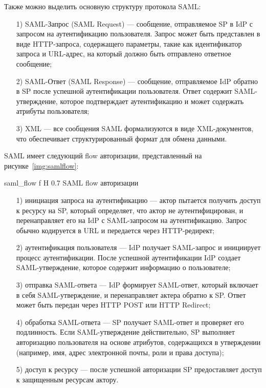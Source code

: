 Также можно выделить основную структуру протокола SAML:
 \begin{enumerate}
  \item[1)] SAML-Запрос (SAML Request) --- сообщение, отправляемое SP в IdP с запросом на аутентификацию пользователя. Запрос может быть представлен в виде HTTP-запроса, содержащего параметры, такие как идентификатор запроса и URL-адрес, на который должно быть отправлено ответное сообщение;
  \item[2)] SAML-Ответ (SAML Response) --- сообщение, отправляемое IdP обратно в SP после успешной аутентификации пользователя. Ответ содержит SAML-утверждение, которое подтверждает аутентификацию и может содержать атрибуты пользователя;
  \item[3)] XML --- все сообщения SAML формализуются в виде XML-документов, что обеспечивает  структурированный формат для обмена данными.
\end{enumerate}

SAML имеет следующий flow авторизации, представленный на рисунке~\ref{img:samlflow}:

    {saml_flow}
    {f}
    {H}
    {0.7\textwidth}
    {SAML flow авторизации}


 \begin{enumerate}
  \item[1)] инициация запроса на аутентификацию --- актор пытается получить доступ к ресурсу на SP, который определяет, что актор не аутентифицирован, и перенаправляет его на IdP с SAML-запросом на аутентификацию. Запрос обычно кодируется в URL и передается через HTTP-редирект;
  \item[2)] аутентификация пользователя --- IdP получает SAML-запрос и инициирует процесс аутентификации. После успешной аутентификации IdP создает SAML-утверждение, которое содержит информацию о пользователе;
  \item[3)] отправка SAML-ответа --- IdP формирует SAML-ответ, который включает в себя SAML-утверждение, и перенаправляет актера обратно к SP. Ответ может быть передан через HTTP POST или HTTP Redirect;
  \item[4)] обработка SAML-ответа --- SP получает SAML-ответ и проверяет его подлинность. Если SAML-утверждение действительно, SP выполняет авторизацию пользователя на основе атрибутов, содержащихся в утверждении (например, имя, адрес электронной почты, роли и права доступа);
  \item[5)] доступ к ресурсу --- после успешной авторизации SP предоставляет доступ к защищенным ресурсам актору.~\cite{saml}
\end{enumerate}


